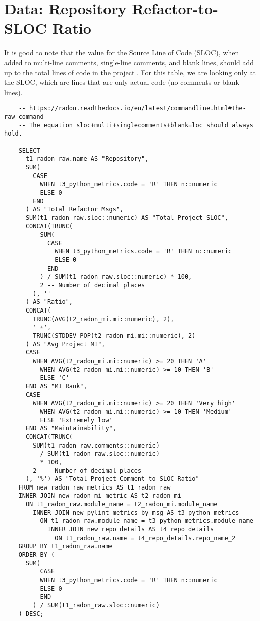 \section{Data: Repository Refactor-to-SLOC Ratio} \label{appendixRefactorRatio}

It is good to note that the value for the Source Line of Code (SLOC), when added to multi-line comments, single-line comments, and blank lines, should add up to the total lines of code in the project \cite{radon:docs}. For this table, we are looking only at the SLOC, which are lines that are only actual code (no comments or blank lines).

\begin{singlespace}
  \begin{verbatim}
    -- https://radon.readthedocs.io/en/latest/commandline.html#the-raw-command
    -- The equation sloc+multi+singlecomments+blank=loc should always hold.

    SELECT
      t1_radon_raw.name AS "Repository",
      SUM(
        CASE
          WHEN t3_python_metrics.code = 'R' THEN n::numeric
          ELSE 0
        END
      ) AS "Total Refactor Msgs",
      SUM(t1_radon_raw.sloc::numeric) AS "Total Project SLOC",
      CONCAT(TRUNC(
          SUM(
            CASE
              WHEN t3_python_metrics.code = 'R' THEN n::numeric
              ELSE 0
            END
          ) / SUM(t1_radon_raw.sloc::numeric) * 100,
          2 -- Number of decimal places
        ), ''
      ) AS "Ratio",
      CONCAT(
        TRUNC(AVG(t2_radon_mi.mi::numeric), 2), 
        ' ±', 
        TRUNC(STDDEV_POP(t2_radon_mi.mi::numeric), 2)
      ) AS "Avg Project MI",
      CASE
        WHEN AVG(t2_radon_mi.mi::numeric) >= 20 THEN 'A'
          WHEN AVG(t2_radon_mi.mi::numeric) >= 10 THEN 'B'
          ELSE 'C'
      END AS "MI Rank",
      CASE
        WHEN AVG(t2_radon_mi.mi::numeric) >= 20 THEN 'Very high'
          WHEN AVG(t2_radon_mi.mi::numeric) >= 10 THEN 'Medium'
          ELSE 'Extremely low'
      END AS "Maintainability",
      CONCAT(TRUNC(
        SUM(t1_radon_raw.comments::numeric) 
          / SUM(t1_radon_raw.sloc::numeric) 
          * 100, 
        2  -- Number of decimal places
      ), '%') AS "Total Project Comment-to-SLOC Ratio"
    FROM new_radon_raw_metrics AS t1_radon_raw
    INNER JOIN new_radon_mi_metric AS t2_radon_mi
      ON t1_radon_raw.module_name = t2_radon_mi.module_name
        INNER JOIN new_pylint_metrics_by_msg AS t3_python_metrics
          ON t1_radon_raw.module_name = t3_python_metrics.module_name
            INNER JOIN new_repo_details AS t4_repo_details
              ON t1_radon_raw.name = t4_repo_details.repo_name_2
    GROUP BY t1_radon_raw.name
    ORDER BY (
      SUM(
          CASE
          WHEN t3_python_metrics.code = 'R' THEN n::numeric
          ELSE 0
          END
        ) / SUM(t1_radon_raw.sloc::numeric)
    ) DESC; 
  \end{verbatim}
\end{singlespace}

